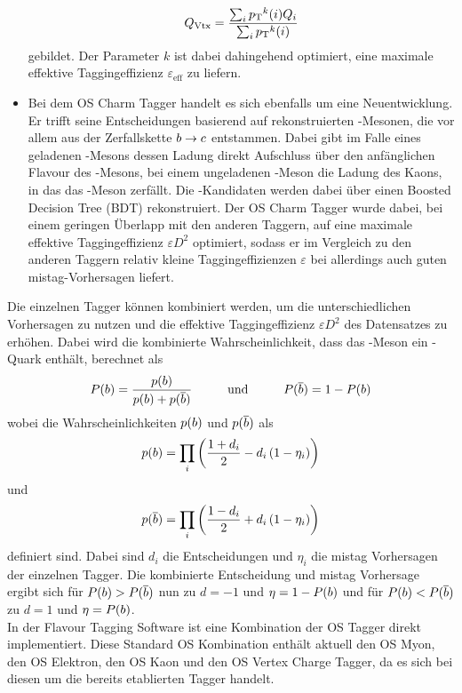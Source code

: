 \begin{itemize}
\begin{equation}
Q_\text{Vtx}=\frac{\sum_{i}\mbox{$p_{\rm T}$}^k(i)Q_i}{\sum_{i}\mbox{$p_{\rm T}$}^k(i)}
\end{equation}
gebildet. Der Parameter $k$ ist dabei dahingehend optimiert, eine maximale effektive Taggingeffizienz $\varepsilon_\text{eff}$ zu liefern.
\item Bei dem OS Charm Tagger handelt es sich ebenfalls um eine Neuentwicklung. Er trifft seine Entscheidungen basierend auf rekonstruierten \D-Mesonen, die vor allem aus der Zerfallskette ${b}\rightarrow{\ensuremath{c}}$ entstammen. Dabei gibt im Falle eines geladenen \D-Mesons dessen Ladung direkt Aufschluss über den anfänglichen Flavour des \B-Mesons, bei einem ungeladenen \D-Meson die Ladung des Kaons, in das das \D-Meson zerfällt. Die \D-Kandidaten werden dabei über einen Boosted Decision Tree (BDT) rekonstruiert. Der OS Charm Tagger wurde dabei, bei einem geringen Überlapp mit den anderen Taggern, auf eine maximale effektive Taggingeffizienz $\varepsilon D^2$ optimiert, sodass er im Vergleich zu den anderen Taggern relativ kleine Taggingeffizienzen $\varepsilon$ bei allerdings auch guten mistag-Vorhersagen liefert.
\end{itemize}
Die einzelnen Tagger können kombiniert werden, um die unterschiedlichen Vorhersagen zu nutzen und die effektive Taggingeffizienz $\varepsilon D^2$ des Datensatzes zu erhöhen. Dabei wird die kombinierte Wahrscheinlichkeit, dass das \B-Meson ein \bquark-Quark enthält, berechnet als
\begin{equation}
P({b})=\frac{p({b})}{p({b})+p({\overline {{b}}})} \hspace{1cm}\text{und}\hspace{1cm}P({\overline {{b}}})=1-P({b})
\end{equation}
wobei die Wahrscheinlichkeiten $p({b})$ und $p({\overline {{b}}})$ als
\begin{equation}
p({b})=\prod_{i}\left(\frac{1+d_i}{2}-d_i\left(1-\eta_i\right)\right)
\end{equation}
und
\begin{equation}
p({\overline {{b}}})=\prod_{i}\left(\frac{1-d_i}{2}+d_i\left(1-\eta_i\right)\right)
\end{equation}
definiert sind. Dabei sind $d_i$ die Entscheidungen und $\eta_i$ die mistag Vorhersagen der einzelnen Tagger. Die kombinierte Entscheidung und mistag Vorhersage ergibt sich für $P({b})>P({\overline {{b}}})$ nun zu $d=-1$ und $\eta=1-P({b})$ und für $P({b})<P({\overline {{b}}})$ zu $d=1$ und $\eta=P({b})$.\\
In der Flavour Tagging Software ist eine Kombination der OS Tagger direkt implementiert. Diese Standard OS Kombination enthält aktuell den OS Myon, den OS Elektron, den OS Kaon und den OS Vertex Charge Tagger, da es sich bei diesen um die bereits etablierten Tagger handelt.

